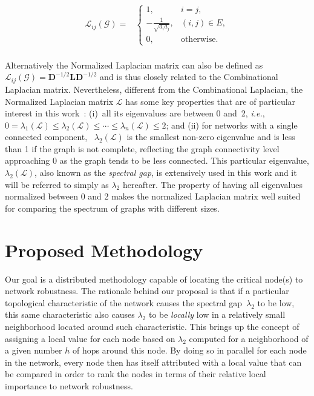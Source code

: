 \documentclass[conference,fleqn]{IEEEtran}
\begin{document}
\begin{equation}
\begin{split}
	\mathcal{L}_{ij}(\mathcal{G}) = &
	\begin{cases}
		1, & i = j,\\
		-\frac{1}{\sqrt{d_id_j}},  & (i,j) \in E,\\
		0,   & \text{otherwise.}
	\end{cases}\\
\end{split}
\end{equation}

Alternatively the Normalized Laplacian matrix can also be defined as 
$\mathcal{L}_{ij}(\mathcal{G}) = \mathbf{D}^{-1/2}\mathbf{L}\mathbf{D}^{-1/2}$ 
and is thus closely related to the Combinational Laplacian matrix.
Nevertheless, different from the Combinational Laplacian, the Normalized Laplacian matrix $\mathcal{L}$ 
has some key properties that are of particular interest in this work~\cite{Mohar1991,Chung1997,Spielman2010}:
(i)~all its eigenvalues are between 0 and~2, \textit{i.e.}, $0 = \lambda_1(\mathcal{L}) \leq \lambda_2(\mathcal{L}) \leq \cdots \leq 
\lambda_n(\mathcal{L}) \leq 2$; 
and (ii) for networks with a single connected component, ~$\lambda_2(\mathcal{L})$ is the 
smallest non-zero eigenvalue and is less than 1 if the graph is not complete, reflecting the graph 
connectivity level approaching 0 as the graph tends to be less connected.  
This particular eigenvalue, $\lambda_2(\mathcal{L})$, also known as the \emph{spectral gap}, is extensively 
used in this work and it will be referred to simply as $\lambda_2$ hereafter. 
The property of having all eigenvalues normalized between 0 and 2 makes the normalized Laplacian matrix well suited for comparing the
spectrum of graphs with different sizes.

\section{Proposed Methodology}
\label{sec:Des}

Our goal is a distributed methodology capable of locating the critical node(s) to network robustness.
The rationale behind our proposal is that if a particular topological characteristic of the network causes the spectral gap~$\lambda_2$ to be 
low, this same characteristic also causes $\lambda_2$ to be \emph{locally} low in a relatively small neighborhood 
located around such characteristic. This brings up the concept of assigning a local value for each node based on $\lambda_2$ computed for a 
neighborhood of a given number $h$ of hops around this node. By doing so in parallel for each node in the network,
every node then has itself attributed with a local value that can be compared in
order to rank the nodes in terms of their relative local importance to network robustness.
\end{document}
